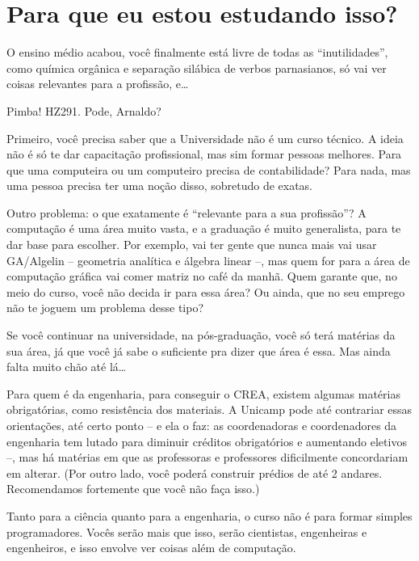 
\section{Para que eu estou estudando isso?}

O ensino médio acabou, você finalmente está livre de todas as ``inutilidades'',
como química orgânica e separação silábica de verbos parnasianos, só vai ver
coisas relevantes para a profissão, e{\dots}

Pimba! HZ291. Pode, Arnaldo?

Primeiro, você precisa saber que a Universidade não é um curso técnico. A ideia
não é só te dar capacitação profissional, mas sim formar pessoas melhores. Para
que uma computeira ou um computeiro precisa de contabilidade? Para nada, mas
uma pessoa precisa ter uma noção disso, sobretudo de exatas.

Outro problema: o que exatamente é ``relevante para a sua profissão''?  A
computação é uma área muito vasta, e a graduação é muito generalista, para te
dar base para escolher. Por exemplo, vai ter gente que nunca mais vai usar
GA/Algelin -- geometria analítica e álgebra linear --, mas quem for para a área
de computação gráfica vai comer matriz no café da manhã. Quem garante que, no
meio do curso, você não decida ir para essa área? Ou ainda, que no seu emprego
não te joguem um problema desse tipo?

Se você continuar na universidade, na pós\--gra\-dua\-ção, você só terá
matérias da sua área, já que você já sabe o suficiente pra dizer que área é
essa. Mas ainda falta muito chão até lá{\dots}

Para quem é da engenharia, para conseguir o CREA, existem algumas matérias
obrigatórias, co\-mo resistência dos materiais. A Unicamp pode até contrariar
essas orientações, até certo ponto -- e ela o faz: as coordenadoras e
coordenadores da engenharia tem lutado para diminuir créditos obrigatórios e
aumentando eletivos --, mas há matérias em que as professoras e professores
dificilmente concordariam em alterar. (Por outro lado, você poderá construir
prédios de até 2 andares. Recomendamos fortemente que você não faça isso.)

Tanto para a ciência quanto para a engenharia, o curso não é para formar
simples programadores. Vocês serão mais que isso, serão cientistas, engenheiras
e engenheiros, e isso envolve ver coisas além de computação.
